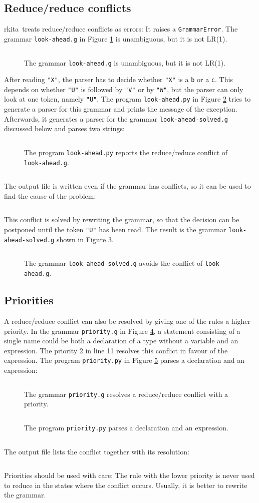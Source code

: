 \documentclass[11pt,a4paper]{article}
\makeatletter
\newcommand{\fakesc}[1]{\resizebox{!}{0.99ex}{\textls[90]{\MakeUppercase{#1}}}}
\def\@simtextsc#1#2\@nil{\MakeUppercase{#1}\fakesc{#2}}
\newcommand{\simtextsc}[1]{%
  \ifmmode\text{\@simtextsc#1\@nil}\else\@simtextsc#1\@nil\fi}
\newcommand{\Larkita}{\simtextsc{Larkita}}
\newenvironment{unbreakable}{\par\noindent\begin{minipage}{\linewidth}}{\end{minipage}\par}
\newcommand{\codefigure}[5][]{\begin{figure}[H]%
  \inputminted[numbers = left, numbersep = 0.3cm, #1]{#2}{examples/#3}%
  \vspace*{-0.3cm}%
  \caption{#5}\label{#4}\end{figure}}
\newcommand{\grammarfile}[2]{\codefigure{larkita_lexer.py:LarkitaLexer}{#1}{fig:#1}{#2}}
\newcommand{\pythonfile}[2]{\codefigure{python3}{#1}{fig:#1}{#2}}
\newcommand{\resultfile}[2][\normalsize]{\begin{unbreakable}%
  \inputminted[fontsize = #1, breaklines]{text}{examples/output/#2.txt}\end{unbreakable}}
\makeatother
\begin{document}
\subsection{Reduce/reduce conflicts}
\Larkita\ treats reduce/reduce conflicts as errors: It raises a \texttt{GrammarError}.  The grammar
\texttt{look-ahead.g} in Figure \ref{fig:look-ahead.g} is unambiguous, but it is not LR(1).
\grammarfile{look-ahead.g}{The grammar \texttt{look-ahead.g} is unambiguous, but it is not LR(1).}
After reading \verb|"X"|, the parser has to decide whether \verb|"X"| is a \texttt{b} or a \texttt{c}.  This
depends on whether \verb|"U"| is followed by \verb|"V"| or by \verb|"W"|, but the parser can only look at one
token, namely \verb|"U"|.  The program \texttt{look-ahead.py} in Figure \ref{fig:look-ahead.py} tries to
generate a parser for this grammar and prints the message of the exception.  Afterwards, it generates a
parser for the grammar \texttt{look-ahead-solved.g} discussed below and parses two strings:
\pythonfile{look-ahead.py}{The program \texttt{look-ahead.py} reports the reduce/reduce conflict of
  \texttt{look-ahead.g}.}
\resultfile[\small]{look-ahead}
The output file is written even if the grammar has conflicts, so it can be used to find the cause of the
problem:
\resultfile[\small]{look-ahead-state}
This conflict is solved by rewriting the grammar, so that the decision can be postponed until the token
\verb|"U"| has been read.  The result is the grammar \texttt{look-ahead-solved.g} shown in Figure
\ref{fig:look-ahead-solved.g}.
\grammarfile{look-ahead-solved.g}{The grammar \texttt{look-ahead-solved.g} avoids the conflict of
  \texttt{look-ahead.g}.}

\subsection{Priorities}
\label{sec:priorities}
A reduce/reduce conflict can also be resolved by giving one of the rules a higher priority.  In the grammar
\texttt{priority.g} in Figure \ref{fig:priority.g}, a statement consisting of a single name could be both a
declaration of a type without a variable and an expression.  The priority 2 in line 11 resolves this conflict
in favour of the expression.  The program \texttt{priority.py} in Figure \ref{fig:priority.py} parses a
declaration and an expression:
\grammarfile{priority.g}{The grammar \texttt{priority.g} resolves a reduce/reduce conflict with a priority.}
\pythonfile{priority.py}{The program \texttt{priority.py} parses a declaration and an expression.}
\resultfile{priority}
The output file lists the conflict together with its resolution:
\resultfile[\small]{priority-conflicts}
Priorities should be used with care:  The rule with the lower priority is never used to reduce in the
states where the conflict occurs.  Usually, it is better to rewrite the grammar.
\end{document}
